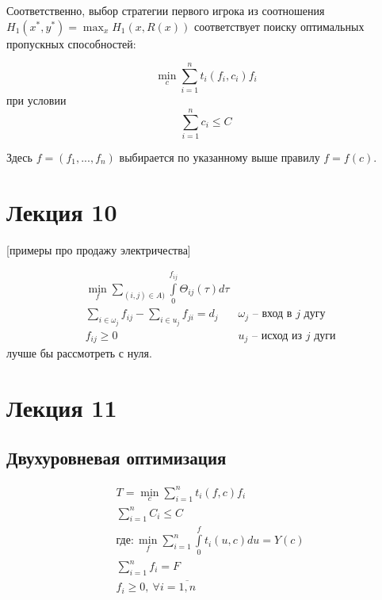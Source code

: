 \documentclass[12pt,a4paper,titlepage,oneside]{book}
\theoremstyle{definition}
\theoremstyle{plain}
\theoremstyle{remark}
\theoremstyle{remark}
\theoremstyle{plain}
\theoremstyle{plain}
\begin{document}
Соответственно, выбор стратегии первого игрока из соотношения $ \displaystyle H_1(x^*,y^*) = \max_x H_1(x,R(x))$ соответствует поиску оптимальных пропускных способностей:

$$\min_c \sum_{i=1}^n t_i(f_i,c_i)f_i$$
при условии
$$\sum_{i=1}^n c_i \leqslant C$$ 

Здесь $f=(f_1,...,f_n)$ выбирается по указанному выше правилу $f=f(c)$.
\chapter{Лекция 10}

[примеры про продажу электричества]


\begin{align*}
&\min\limits_f \sum \limits_{(i,j) \in A)} \int\limits_0^{f_{ij}} \Theta_{ij}(\tau) d \tau \\
&\sum \limits_{i \in \omega_j} f_{ij} - \sum\limits_{i\in u_j} f_{ji} = d_j & \omega_j \text{ -- вход в $j$ дугу}\\
&f_{ij} \geq 0 & u_j \text{ -- исход из $j$ дуги}
\end{align*}
лучше бы рассмотреть с нуля.
\chapter{Лекция 11}
\section{Двухуровневая оптимизация}
\begin{align*}
&T= \min  \limits_{c} \sum \limits_{i=1}^n t_i(f,c)f_i\\
&\sum \limits_{i=1}^n C_i \leqslant C\\
&\text {где}: \min \limits_{f} \sum \limits_{i=1}^n \int \limits_{0}^f t_i(u,c)du=Y(c)\\
&\sum \limits_{i=1}^n f_i=F\\
&f_i \geqslant 0, \: \forall i= \overline{1,n}\\
\end{align*}
\end{document}
